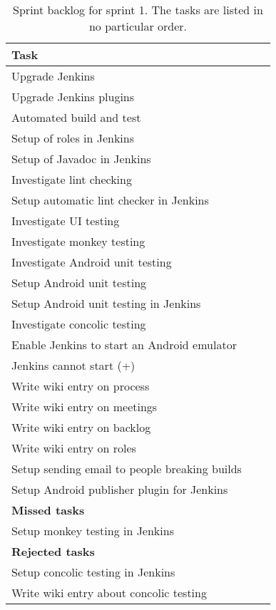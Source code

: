 \begin{table}%
  \centering
  \begin{tabular}{p{}rr}
    \toprule
    \textbf{Task} \\
    \midrule
    Upgrade Jenkins                                   \\
    Upgrade Jenkins plugins                           \\
    Automated build and test                          \\
    Setup of roles in Jenkins                         \\
    Setup of Javadoc in Jenkins                       \\
    Investigate lint checking                         \\
    Setup automatic lint checker in Jenkins           \\
    Investigate UI testing                            \\
    Investigate monkey testing                        \\
    Investigate Android unit testing                  \\
    Setup Android unit testing                        \\
    Setup Android unit testing in Jenkins             \\
    Investigate concolic testing                      \\
    Enable Jenkins to start an Android emulator       \\
    Jenkins cannot start (+)                          \\
    Write wiki entry on process                       \\
    Write wiki entry on meetings                      \\
    Write wiki entry on backlog                       \\
    Write wiki entry on roles                         \\
    Setup sending email to people breaking builds     \\
    Setup Android publisher plugin for Jenkins        \\
    \midrule
    \textbf{Missed tasks} & & \\
    \midrule
    Setup monkey testing in Jenkins                   \\
    \midrule
    \textbf{Rejected tasks} & & \\
    \midrule
    Setup concolic testing in Jenkins                 \\
    Write wiki entry about concolic testing           \\
    \bottomrule
  \end{tabular}
\caption[Sprint 1 backlog]{Sprint backlog for sprint 1. The tasks are listed in no particular order.}
\label{tab:sprint1_tasks}
\end{table}

